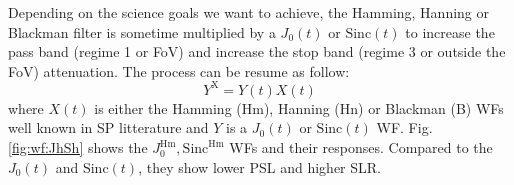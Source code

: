 \documentclass[useAMS,usenatbib]{mn2e}
\newcommand{\OMS}[1]{\textcolor{red}{{\bf OMS: #1}}}
\begin{document}
Depending on the science goals we want to achieve, the Hamming, Hanning or Blackman filter is sometime multiplied by 
a $J_0(t)$ or $\mathrm{Sinc}(t)$ to increase the pass band (regime 1 or FoV) and 
increase the stop band (regime 3 or outside the FoV) attenuation.
The process can be resume as follow:
\begin{equation}
Y^\mathrm{X} = Y(t) X(t) 
\end{equation}
where $X(t)$ is either the Hamming (Hm), Hanning (Hn) or Blackman (B) WFs well known in SP litterature
\citep{nuttall1982spectral,podder2014comparative} and $Y$ is a $J_0(t)$ or $\mathrm{Sinc}(t)$ WF.
Fig. \ref{fig:wf:JhSh} shows the $J_0^\mathrm{Hm}, \mathrm{Sinc}^\mathrm{Hm}$ WFs and their responses. Compared to the $J_0(t)$ and 
$\mathrm{Sinc}(t)$, they show lower PSL and higher SLR.
\end{document}

